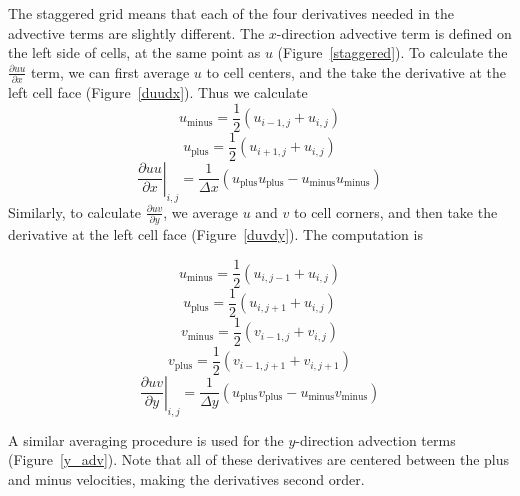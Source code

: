 \documentclass[12pt]{article}
\begin{document}
\FloatBarrier
The staggered grid means that each of the four derivatives needed in the advective terms are slightly different.  The $x$-direction advective term is defined on the left side of cells, at the same point as $u$ (Figure~\ref{staggered}).  To calculate the $\frac{\partial uu}{\partial x}$ term, we can first average $u$ to cell centers, and the take the derivative at the left cell face (Figure~\ref{duudx}).  Thus we calculate
\[ u_{\text{minus}} = \frac{1}{2}\left(u_{i-1,j}+u_{i,j} \right) \]
\[ u_{\text{plus}} = \frac{1}{2}\left(u_{i+1,j}+u_{i,j} \right) \]
\[ \left.\frac{\partial uu}{\partial x}\right|_{i,j} = \frac{1}{\Delta x}\left( u_{\text{plus}}u_{\text{plus}} - u_{\text{minus}}u_{\text{minus}}\right)\]
Similarly, to calculate $\frac{\partial uv}{\partial y}$, we average $u$ and $v$ to cell corners, and then take the derivative at the left cell face (Figure~\ref{duvdy}).  The computation is

\[ u_{\text{minus}} = \frac{1}{2}\left(u_{i,j-1}+u_{i,j} \right) \]
\[ u_{\text{plus}} = \frac{1}{2}\left(u_{i,j+1}+u_{i,j} \right) \]
\[ v_{\text{minus}} = \frac{1}{2}\left(v_{i-1,j}+v_{i,j} \right) \]
\[ v_{\text{plus}} = \frac{1}{2}\left(v_{i-1,j+1}+v_{i,j+1} \right) \]
\[ \left.\frac{\partial uv}{\partial y}\right|_{i,j} = \frac{1}{\Delta y}\left( u_{\text{plus}}v_{\text{plus}} - u_{\text{minus}}v_{\text{minus}}\right)\]

A similar averaging procedure is used for the $y$-direction advection terms (Figure~\ref{y_adv}).  Note that all of these derivatives are centered between the plus and minus velocities, making the derivatives second order.


\FloatBarrier
\begin{center}
\begin{figure*}[h]
\center
{}  
\caption{First derivatives for $x$ direction advection term.}
\label{x_adv}
\end{figure*}
\end{center}

\begin{center}
\begin{figure*}
\center
{}  
\caption{First derivatives for $x$ direction advection term.}
\label{y_adv}
\end{figure*}
\end{center}
\end{document}
